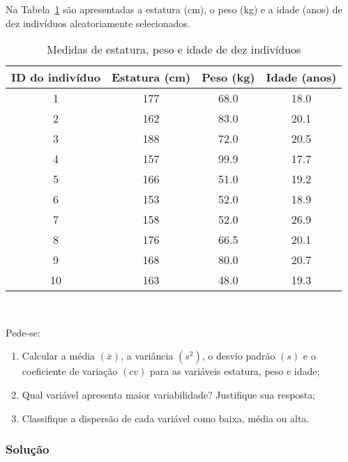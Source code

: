 \documentclass[11pt,fleqn]{book} %
\begin{document}
\begin{example} \label{exemp:coefvar}

Na Tabela~\ref{tab:coefvar} são apresentadas a estatura (cm), o peso (kg) e a idade (anos) de dez indivíduos aleatoriamente selecionados. \\


\begin{table}[h]
	\caption{Medidas de estatura, peso e idade de dez indivíduos}
	\label{tab:coefvar} 
	\vspace{-0.1cm}
	\centering
	\begin{tabular}{c c c c}
	\toprule
	\textbf{ID do indivíduo} & \textbf{Estatura (cm)} & \textbf{Peso (kg)} & \textbf{Idade (anos)} \\
	\midrule
	1 & 177 & 68.0 & 18.0 \\
	2 & 162 & 83.0 & 20.1 \\
	3 & 188 & 72.0 & 20.5 \\
	4 & 157 & 99.9 & 17.7 \\
	5 & 166 & 51.0 & 19.2 \\
	6 & 153 & 52.0 & 18.9 \\
	7 & 158 & 52.0 & 26.9 \\
	8 & 176 & 66.5 & 20.1 \\
	9 & 168 & 80.0 & 20.7 \\
	10 & 163 & 48.0 & 19.3 \\
	\bottomrule
	\end{tabular} \\
\end{table}

Pede-se: \\

\begin{enumerate}[label=\alph*)]
\item Calcular a média $(\bar{x})$, a variância $(s^2)$, o desvio padrão $(s)$ e o coeficiente de variação $(cv)$ para as variáveis estatura, peso e idade; \\
\item Qual variável apresenta maior variabilidade? Justifique sua resposta; \\
\item Classifique a dispersão de cada variável como baixa, média ou alta. \\

\end{enumerate}

\subsubsection{Solução}
\vspace{0,3cm}


\end{example}
\end{document}
